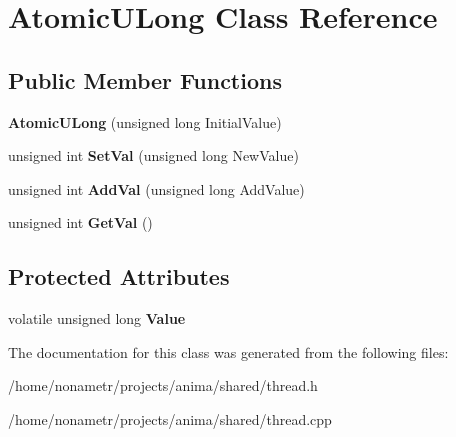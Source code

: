 \hypertarget{classAtomicULong}{
\section{AtomicULong Class Reference}
\label{classAtomicULong}
}
\subsection*{Public Member Functions}
\begin{DoxyCompactItemize}
\item 
\hypertarget{classAtomicULong_a3a096a93ad40cda8bee202c76e2681e6}{
{\bfseries AtomicULong} (unsigned long InitialValue)}
\label{classAtomicULong_a3a096a93ad40cda8bee202c76e2681e6}

\item 
\hypertarget{classAtomicULong_a47dc532a4af8bfc3ab1c8e582b75c6cf}{
unsigned int {\bfseries SetVal} (unsigned long NewValue)}
\label{classAtomicULong_a47dc532a4af8bfc3ab1c8e582b75c6cf}

\item 
\hypertarget{classAtomicULong_a081cc984d0cb34a4eaa067f511db3c5c}{
unsigned int {\bfseries AddVal} (unsigned long AddValue)}
\label{classAtomicULong_a081cc984d0cb34a4eaa067f511db3c5c}

\item 
\hypertarget{classAtomicULong_a6b12a59005990ca71bcf8356c7131d09}{
unsigned int {\bfseries GetVal} ()}
\label{classAtomicULong_a6b12a59005990ca71bcf8356c7131d09}

\end{DoxyCompactItemize}
\subsection*{Protected Attributes}
\begin{DoxyCompactItemize}
\item 
\hypertarget{classAtomicULong_a65f08ef36d8f8160866d1c8a15dd47af}{
volatile unsigned long {\bfseries Value}}
\label{classAtomicULong_a65f08ef36d8f8160866d1c8a15dd47af}

\end{DoxyCompactItemize}


The documentation for this class was generated from the following files:\begin{DoxyCompactItemize}
\item 
/home/nonametr/projects/anima/shared/thread.h\item 
/home/nonametr/projects/anima/shared/thread.cpp\end{DoxyCompactItemize}
